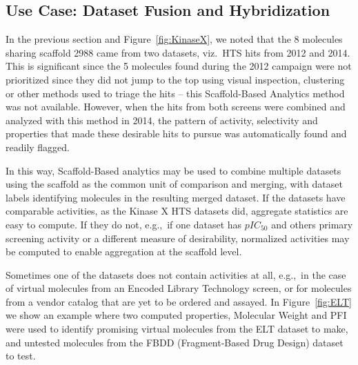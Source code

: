 \documentclass[journal=jacsat,manuscript=article]{achemso}
\newcommand*\fref[1]{Figure~\ref{fig:#1}}
\newcommand*\eg{e.g.,~}
\newcommand*\viz{viz.~}
\begin{document}
\subsection{Use Case: Dataset Fusion and Hybridization}
In the previous section and \fref{KinaseX}, we noted that the 8 molecules sharing scaffold 2988 came from two datasets, \viz HTS hits from 2012 and 2014. This is significant since the 5 molecules found during the 2012 campaign were not prioritized since they did not jump to the top using visual inspection, clustering or other methods used to triage the hits -- this Scaffold-Based Analytics method was not available. However, when the hits from both screens were combined and analyzed with this method in 2014, the pattern of activity, selectivity and properties that made these desirable hits to pursue was automatically found and readily flagged.

In this way, Scaffold-Based analytics may be used to combine multiple datasets using the scaffold as the common unit of comparison and merging, with dataset labels identifying molecules in the resulting merged dataset. If the datasets have comparable activities, as the Kinase X HTS datasets did, aggregate statistics are easy to compute. If they do not, \eg if one dataset has $pIC_{50}$ and others primary screening activity or a different measure of desirability, normalized activities may be computed to enable aggregation at the scaffold level.

Sometimes one of the datasets does not contain activities at all, \eg in the case of virtual molecules from an Encoded Library Technology screen, or for molecules from a vendor catalog that are yet to be ordered and assayed. In \fref{ELT} we show an example where two computed properties, Molecular Weight and PFI were used to identify promising virtual molecules from the ELT dataset to make, and untested molecules from the FBDD (Fragment-Based Drug Design) dataset to test.    
\end{document}
